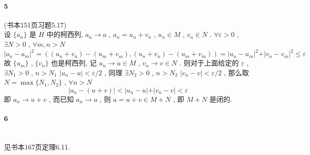 \documentclass[a4paper, UTF8]{ctexart}				%
\numberwithin{equation}{section}				%
\begin{document}
		\paragraph{5}\quad (书本151页习题5.17)\\
			\indent 设 $\{a_n\}$ 是 $H$ 中的柯西列, $a_n \rightarrow a$ , $a_n = u_n + v_n$ , $u_n \in M$ , $v_n \in N$ . $\forall \varepsilon > 0$ , $\exists N > 0$ , $\forall m, n > N$
			\[
				\vert{a_n - a_m}\vert^2 = ({(u_n + v_n) - (u_m + v_m)},{(u_n + v_n) - (u_m + v_m)}) = \vert{u_n - u_m}\vert^2 + \vert{v_n - v_m}\vert^2 \le \varepsilon 
			\]
			故 $\{u_m\}$ , $\{v_n\}$ 也是柯西列, 记 $u_n \rightarrow u \in M$ , $v_n \rightarrow v \in N$ . 则对于上面给定的 $\varepsilon$ , $\exists N_1 > 0$ , $n > N_1$ $\vert{u_n - u}\vert < \varepsilon/2$ , 同理 $\exists N_2 > 0$ , $n > N_2$ $\vert{v_n - v}\vert < \varepsilon/2$ , 那么取 $N = \max \{N_1, N_2\}$ , $\forall n > N$ 
			\[
				\vert{a_n - (u + v)}\vert < \vert{u_n - u}\vert + \vert{v_n - v}\vert < \varepsilon
			\]
			即 $a_n \rightarrow u + v$ , 而已知 $a_n \rightarrow a$ , 则 $a = u + v \in M + N$ , 即 $M + N$ 是闭的.\\

		\paragraph{6}\quad\\
			\indent 见书本167页定理6.11.
\end{document}

